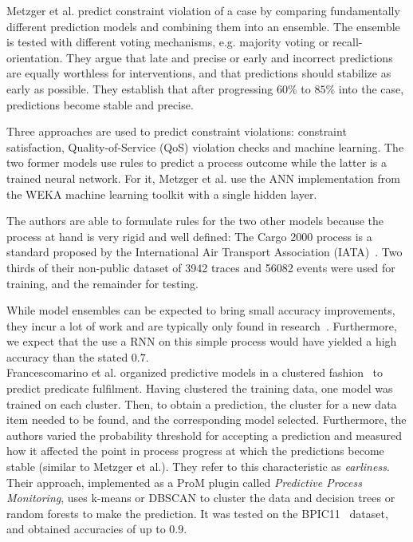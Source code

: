 Metzger et al. predict constraint violation of a case by comparing fundamentally different prediction models and combining them into an ensemble. The ensemble is tested with different voting mechanisms, e.g. majority voting or recall-orientation. They argue that late and precise or early and incorrect predictions are equally worthless for interventions, and that predictions should stabilize as early as possible. They establish that after progressing $60\%$ to $85\%$ into the case, predictions become stable and precise.

Three approaches are used to predict constraint violations: constraint satisfaction, Quality-of-Service (QoS) violation checks and machine learning. The two former models use rules to predict a process outcome while the latter is a trained neural network. For it, Metzger et al. use the ANN implementation from the WEKA machine learning toolkit with a single hidden layer.

The authors are able to formulate rules for the two other models because the process at hand is very rigid and well defined: The Cargo 2000 process is a standard proposed by the International Air Transport Association (IATA)~\cite{metzger2015}. Two thirds of their non-public dataset of 3942 traces and 56082 events were used for training, and the remainder for testing.

While model ensembles can be expected to bring small accuracy improvements, they incur a lot of work and are typically only found in research~\cite{lessmannBADS}. Furthermore, we expect that the use a RNN on this simple process would have yielded a high accuracy than the stated $0.7$.\\

Francescomarino et al. organized predictive models in a clustered fashion~\cite{francescomarino2015} to predict predicate fulfilment. Having clustered the training data, one model was trained on each cluster. Then, to obtain a prediction, the cluster for a new data item needed to be found, and the corresponding model selected. Furthermore, the authors varied the probability threshold for accepting a prediction and measured how it affected the point in process progress at which the predictions become stable (similar to Metzger et al.). They refer to this characteristic as \textit{earliness}. Their approach, implemented as a ProM plugin called \textit{Predictive Process Monitoring}, uses k-means or DBSCAN to cluster the data and decision trees or random forests to make the prediction. It was tested on the BPIC11~\cite{BPIC2011} dataset, and obtained accuracies of up to $0.9$.

